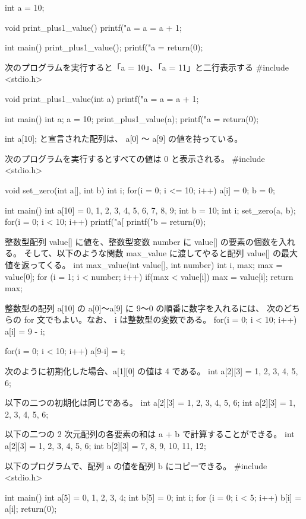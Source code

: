int a = 10;

void print_plus1_value()
{
   printf("a = %
   a = a + 1;
}

int main()
{
  print_plus1_value();
  printf("a = %
  return(0);
}

次のプログラムを実行すると「a = 10」、「a = 11」と二行表示する
#include <stdio.h>

void print_plus1_value(int a)
{
   printf("a = %
   a = a + 1;
}

int main()
{
  int a;
  a = 10;
  print_plus1_value(a);
  printf("a = %
  return(0);
}

int a[10]; と宣言された配列は、 a[0] 〜 a[9] の値を持っている。

次のプログラムを実行するとすべての値は 0 と表示される。
#include <stdio.h>

void set_zero(int a[], int b)
{
  int i;
  for(i = 0; i <= 10; i++) {
    a[i] = 0;
  }
  b = 0;
}

int main()
{
  int a[10] = {0, 1, 2, 3, 4, 5, 6, 7, 8, 9};
  int b = 10;
  int i;
  set_zero(a, b);
  for(i = 0; i < 10; i++) {
    printf("a[%
  }
  printf("b = %
  return(0);
}

整数型配列 value[] に値を、整数型変数 number に value[] の要素の個数を入れる。
そして、以下のような関数 max_value に渡してやると配列 value[] の最大値を返ってくる。
int max_value(int value[], int number)
{
  int i, max;
  max = value[0];
  for (i = 1; i < number; i++) {
    if(max < value[i]) {
      max = value[i];
    }
  }
  return max;
}

整数型の配列 a[10] の a[0]〜a[9] に 9〜0 の順番に数字を入れるには、
次のどちらの for 文でもよい。なお、 i は整数型の変数である。
for(i = 0; i < 10; i++) {
  a[i] = 9 - i;
}

for(i = 0; i < 10; i++) {
  a[9-i] = i;
}

次のように初期化した場合、a[1][0] の値は 4 である。
int a[2][3] = {1, 2, 3, 4, 5, 6};


以下の二つの初期化は同じである。
int a[2][3] = {1, 2, 3, 4, 5, 6};
int a[2][3] = {{1, 2, 3}, {4, 5, 6}};

以下の二つの 2 次元配列の各要素の和は a + b で計算することができる。
int a[2][3] = {{1, 2, 3}, {4, 5, 6}};
int b[2][3] = {{7, 8, 9}, {10, 11, 12}};

以下のプログラムで、配列 a の値を配列 b にコピーできる。
#include <stdio.h>

int main()
{
  int a[5] = {0, 1, 2, 3, 4};
  int b[5] = {0};
  int i;
  for (i = 0; i < 5; i++) {
    b[i] = a[i];
  }
  return(0);
}
